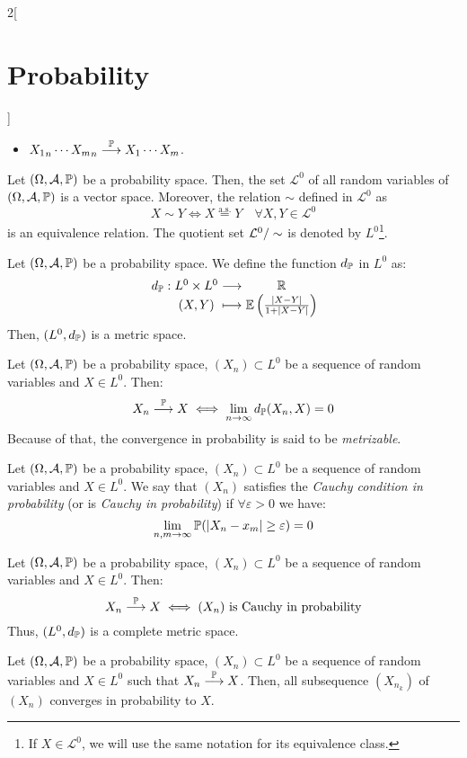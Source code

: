 \documentclass[../../../main.tex]{subfiles}
\begin{document}
\begin{multicols}{2}[\section{Probability}]
\begin{corollary}
\begin{itemize}
            \item ${X_1}_n\cdots{X_m}_n\overset{\mathbb{P}}{\longrightarrow}X_1\cdots X_m$.
        \end{itemize}
    \end{corollary}
    \begin{lemma}
        Let $(\Omega,\mathcal{A},\mathbb{P})$ be a probability space. Then, the set $\mathcal{L}^0$ of all random variables of $(\Omega,\mathcal{A},\mathbb{P})$ is a vector space. Moreover, the relation $\sim$ defined in $\mathcal{L}^0$ as $$X\sim Y\iff X\overset{\text{a.s.}}{=} Y\quad\forall X,Y\in\mathcal{L}^0$$ is an equivalence relation. The quotient set $\quot{\mathcal{L}^0}{\sim}$ is denoted by $L^0$\footnote{If $X\in\mathcal{L}^0$, we will use the same notation for its equivalence class.}.
    \end{lemma}
    \begin{prop}
        Let $(\Omega,\mathcal{A},\mathbb{P})$ be a probability space. We define the function $d_{\mathbb{P}}$ in $L^0$ as:
        $$\function{d_\Prob}{L^0\times L^0}{\RR}{(X,Y)}{\Exp\left(\frac{|X-Y|}{1+|X-Y|}\right)}$$
        Then, $(L^0,d_{\mathbb{P}})$ is a metric space.
    \end{prop}
    \begin{prop}
        Let $(\Omega,\mathcal{A},\mathbb{P})$ be a probability space, $(X_n)\subset L^0$ be a sequence of random variables and $X\in L^0$. Then:
        $$X_n\overset{\mathbb{P}}{\longrightarrow} X\iff\lim_{n\to\infty} d_{\mathbb{P}}(X_n,X)=0$$
        Because of that, the convergence in probability is said to be \textit{metrizable}.
    \end{prop}
    \begin{definition}
        Let $(\Omega,\mathcal{A},\mathbb{P})$ be a probability space, $(X_n)\subset L^0$ be a sequence of random variables and $X\in L^0$. We say that $(X_n)$ satisfies the \textit{Cauchy condition in probability} (or is \textit{Cauchy in probability}) if $\forall \varepsilon >0$ we have: $$\lim_{n,m\to\infty}\mathbb{P}(|X_n-x_m|\geq \varepsilon)=0$$
    \end{definition}
    \begin{prop}
        Let $(\Omega,\mathcal{A},\mathbb{P})$ be a probability space, $(X_n)\subset L^0$ be a sequence of random variables and $X\in L^0$. Then:
        $$X_n\overset{\mathbb{P}}{\longrightarrow} X\iff(X_n)\text{ is Cauchy in probability}$$
        Thus, $(L^0,d_{\mathbb{P}})$ is a complete metric space.
    \end{prop}
    \begin{prop}
        Let $(\Omega,\mathcal{A},\mathbb{P})$ be a probability space, $(X_n)\subset L^0$ be a sequence of random variables and $X\in L^0$ such that $X_n\overset{\mathbb{P}}{\longrightarrow} X$. Then, all subsequence $(X_{n_k})$ of $(X_n)$ converges in probability to $X$.
    \end{prop}

\end{multicols}
\end{document}
